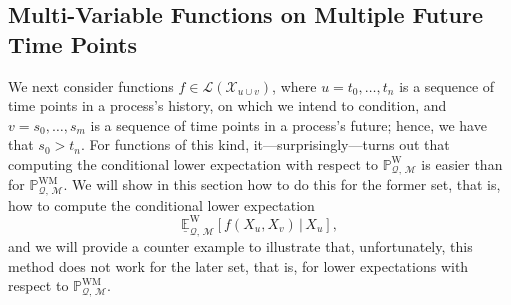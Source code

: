 \documentclass[10pt,a4paper]{paper}
\theoremstyle{definition}
\newcommand{\states}{\mathcal{X}}
\newcommand{\processes}{\mathbb{P}}
\newcommand{\wprocesses}{\processes^{\mathrm{W}}}
\newcommand{\wmprocesses}{\processes^{\mathrm{WM}}}
\newcommand{\gambles}{\mathcal{L}}
\newcommand{\gamblesX}{\gambles(\states)}
\newcommand{\rateset}{\mathcal{Q}}
\begin{document}
\subsection{Multi-Variable Functions on Multiple Future Time Points}\label{sec:decomposition}

We next consider functions $f\in\gambles(\states_{u\cup v})$, where $u=t_0,\ldots,t_n$ is a sequence of time points in a process's history, on which we intend to condition, and $v=s_0,\ldots,s_m$ is a sequence of time points in a process's future; hence, we have that $s_0>t_n$. For functions of this kind, it---surprisingly---turns out that computing the conditional lower expectation with respect to $\wprocesses_{\rateset,\,\mathcal{M}}$ is easier than for $\wmprocesses_{\rateset,\,\mathcal{M}}$. We will show in this section how to do this for the former set, that is, how to compute the conditional lower expectation
\begin{equation}\label{eq:lowerexpmultipletimepoints}
\underline{\mathbb{E}}_{\rateset,\,\mathcal{M}}^{\mathrm{W}}[f(X_u,X_v)\,\vert\,X_u],
\end{equation}
and we will provide a counter example to illustrate that, unfortunately, this method does not work for the later set, that is, for lower expectations with respect to $\wmprocesses_{\rateset,\,\mathcal{M}}$.

\end{document}
